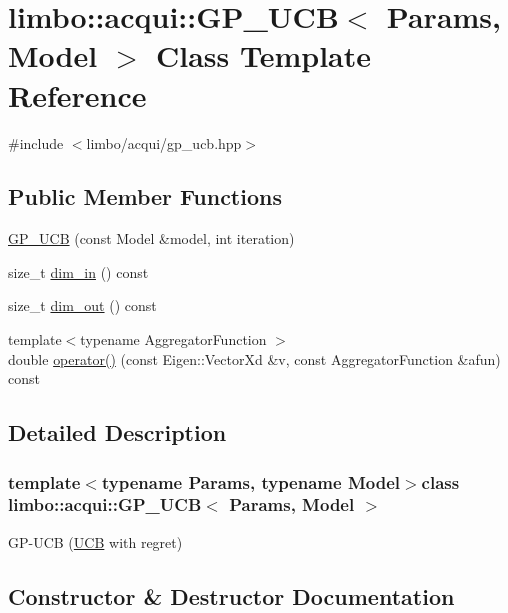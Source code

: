 \hypertarget{classlimbo_1_1acqui_1_1_g_p___u_c_b}{}\section{limbo\+:\+:acqui\+:\+:G\+P\+\_\+\+U\+C\+B$<$ Params, Model $>$ Class Template Reference}
\label{classlimbo_1_1acqui_1_1_g_p___u_c_b}


{\ttfamily \#include $<$limbo/acqui/gp\+\_\+ucb.\+hpp$>$}

\subsection*{Public Member Functions}
\begin{DoxyCompactItemize}
\item 
\hyperlink{classlimbo_1_1acqui_1_1_g_p___u_c_b_a9846faaa39b1d1d7b039284f2c905205}{G\+P\+\_\+\+U\+C\+B} (const Model \&model, int iteration)
\item 
size\+\_\+t \hyperlink{classlimbo_1_1acqui_1_1_g_p___u_c_b_a30c58b2f857da76de61e8cf555e73d06}{dim\+\_\+in} () const 
\item 
size\+\_\+t \hyperlink{classlimbo_1_1acqui_1_1_g_p___u_c_b_abde3ddcfa0bfb16d453587832f4e78b1}{dim\+\_\+out} () const 
\item 
{\footnotesize template$<$typename Aggregator\+Function $>$ }\\double \hyperlink{classlimbo_1_1acqui_1_1_g_p___u_c_b_a810a016815ee1e2355654b3a7658d207}{operator()} (const Eigen\+::\+Vector\+Xd \&v, const Aggregator\+Function \&afun) const 
\end{DoxyCompactItemize}


\subsection{Detailed Description}
\subsubsection*{template$<$typename Params, typename Model$>$class limbo\+::acqui\+::\+G\+P\+\_\+\+U\+C\+B$<$ Params, Model $>$}

G\+P-\/\+U\+C\+B (\hyperlink{classlimbo_1_1acqui_1_1_u_c_b}{U\+C\+B} with regret) 

\subsection{Constructor \& Destructor Documentation}
\hypertarget{classlimbo_1_1acqui_1_1_g_p___u_c_b_a9846faaa39b1d1d7b039284f2c905205}{}

